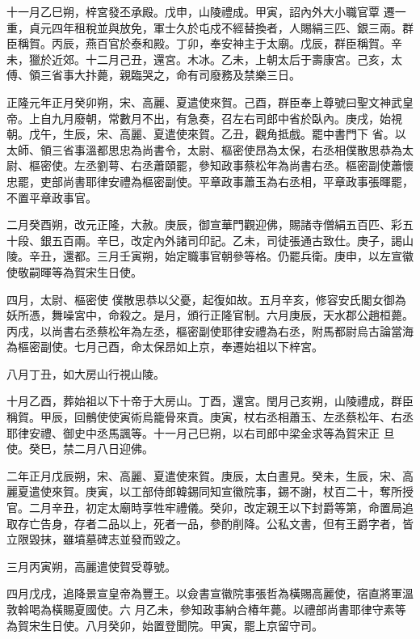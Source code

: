 \begin{pinyinscope}
 十一月乙巳朔，梓宮發丕承殿。戊申，山陵禮成。甲寅，詔內外大小職官覃
 遷一重，貞元四年租稅並與放免，軍士久於屯戍不經替換者，人賜絹三匹、銀三兩。群臣稱賀。丙辰，燕百官於泰和殿。丁卯，奉安神主于太廟。戊辰，群臣稱賀。辛未，獵於近郊。十二月己丑，還宮。木冰。乙未，上朝太后于壽康宮。己亥，太傅、領三省事大抃薨，親臨哭之，命有司廢務及禁樂三日。



 正隆元年正月癸卯朔，宋、高麗、夏遣使來賀。己酉，群臣奉上尊號曰聖文神武皇帝。上自九月廢朝，常數月不出，有急奏，召左右司郎中省於臥內。庚戌，始視朝。戊午，生辰，宋、高麗、夏遣使來賀。乙丑，觀角抵戲。罷中書門下
 省。以太師、領三省事溫都思忠為尚書令，太尉、樞密使昂為太保，右丞相僕散思恭為太尉、樞密使。左丞劉萼、右丞蕭頤罷，參知政事蔡松年為尚書右丞。樞密副使蕭懷忠罷，吏部尚書耶律安禮為樞密副使。平章政事蕭玉為右丞相，平章政事張暉罷，不置平章政事官。



 二月癸酉朔，改元正隆，大赦。庚辰，御宣華門觀迎佛，賜諸寺僧絹五百匹、彩五十段、銀五百兩。辛巳，改定內外諸司印記。乙未，司徒張通古致仕。庚子，謁山陵。辛丑，還都。三月壬寅朔，始定職事官朝參等格。仍罷兵衛。庚申，以左宣徽使敬嗣暉等為賀宋生日使。



 四月，太尉、樞密使
 僕散思恭以父憂，起復如故。五月辛亥，修容安氏閣女御為妖所憑，舞噪宮中，命殺之。是月，頒行正隆官制。六月庚辰，天水郡公趙桓薨。丙戌，以尚書右丞蔡松年為左丞，樞密副使耶律安禮為右丞，附馬都尉烏古論當海為樞密副使。七月己酉，命太保昂如上京，奉遷始祖以下梓宮。



 八月丁丑，如大房山行視山陵。



 十月乙酉，葬始祖以下十帝于大房山。丁酉，還宮。閏月己亥朔，山陵禮成，群臣稱賀。甲辰，回鶻使使寅術烏籠骨來貢。庚寅，杖右丞相蕭玉、左丞蔡松年、右丞耶律安禮、御史中丞馬諷等。十一月己巳朔，以右司郎中梁金求等為賀宋正
 旦使。癸巳，禁二月八日迎佛。



 二年正月戊辰朔，宋、高麗、夏遣使來賀。庚辰，太白晝見。癸未，生辰，宋、高麗夏遣使來賀。庚寅，以工部侍郎韓錫同知宣徽院事，錫不謝，杖百二十，奪所授官。二月辛丑，初定太廟時享牲牢禮儀。癸卯，改定親王以下封爵等第，命置局追取存亡告身，存者二品以上，死者一品，參酌削降。公私文書，但有王爵字者，皆立限毀抹，雖墳墓碑志並發而毀之。



 三月丙寅朔，高麗遣使賀受尊號。



 四月戊戌，追降景宣皇帝為豐王。以僉書宣徽院事張哲為橫賜高麗使，宿直將軍溫敦斡喝為橫賜夏國使。六
 月乙未，參知政事納合椿年薨。以禮部尚書耶律守素等為賀宋生日使。八月癸卯，始置登聞院。甲寅，罷上京留守司。




\end{pinyinscope}
